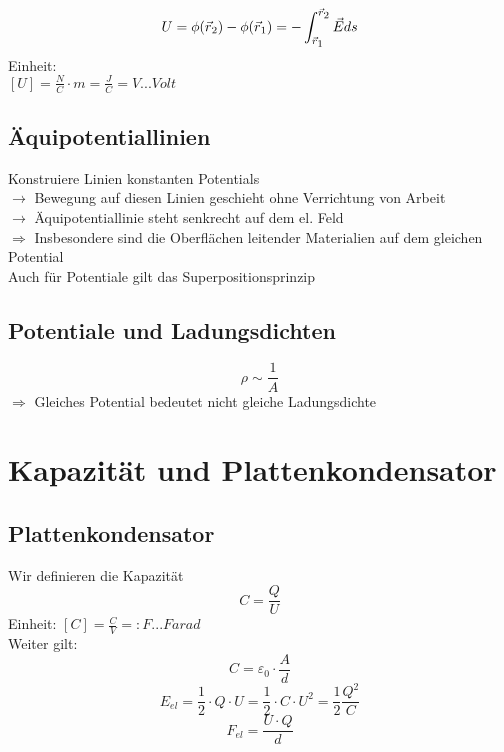 \documentclass[a4paper,12pt]{report}
\begin{document}
\begin{equation}
U = \phi (\vec{r}\textsubscript{2}) -  \phi (\vec{r}\textsubscript{1}) = - \int_{\vec{r}\textsubscript{1}}^{\vec{r}\textsubscript{2}} \vec{E} ds
\end{equation}
Einheit:\\
$ [U] = \frac{N}{C} \cdot m = \frac{J}{C} = V ... Volt $ \\

\subsection{Äquipotentiallinien}
Konstruiere Linien konstanten Potentials\\
$ \rightarrow $ Bewegung auf diesen Linien geschieht ohne Verrichtung von Arbeit\\
$ \rightarrow $ Äquipotentiallinie steht senkrecht auf dem el. Feld\\

$ \Rightarrow$ Insbesondere sind die Oberflächen leitender Materialien auf dem gleichen Potential\\
Auch für Potentiale gilt das Superpositionsprinzip\\

\subsection{Potentiale und Ladungsdichten}
 \begin{equation}
\rho \sim \frac{1}{A}
\end{equation}
$ \Rightarrow$ Gleiches Potential bedeutet nicht gleiche Ladungsdichte

\section{Kapazität und Plattenkondensator}

\subsection{Plattenkondensator}
Wir definieren die Kapazität
\begin{equation}
C = \frac{Q}{U}
\end{equation}
Einheit: $ [C] = \frac{C}{V} =: F ... Farad$\\

Weiter gilt:
\begin{equation}
C = \varepsilon_0 \cdot \frac{A}{d}
\end{equation}
\begin{equation}
E_{el} = \frac{1}{2} \cdot Q \cdot U = \frac{1}{2} \cdot C \cdot U^2 = \frac{1}{2} \frac{Q^2}{C}
\end{equation}
\begin{equation}
F_{el} = \frac{U \cdot Q}{d} 
\end{equation}
\end{document}

